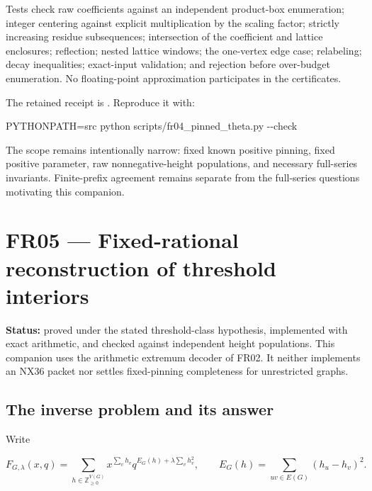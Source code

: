 \documentclass[
  11pt,
  a4paper,
]{report}
\newenvironment{Shaded}{}{}
\newcommand{\AttributeTok}[1]{\textcolor[rgb]{0.49,0.56,0.16}{#1}}
\newcommand{\ExtensionTok}[1]{#1}
\newcommand{\NormalTok}[1]{#1}
\newcommand{\OperatorTok}[1]{\textcolor[rgb]{0.40,0.40,0.40}{#1}}
\newcommand{\VariableTok}[1]{\textcolor[rgb]{0.10,0.09,0.49}{#1}}
\let\singularitytexttt\texttt
\renewcommand{\texttt}[1]{\singularitytexttt{\seqsplit{#1}}}
\begin{document}
Tests check raw coefficients against an independent product-box
enumeration; integer centering against explicit multiplication by the
scaling factor; strictly increasing residue subsequences; intersection
of the coefficient and lattice enclosures; reflection; nested lattice
windows; the one-vertex edge case; relabeling; decay inequalities;
exact-input validation; and rejection before over-budget enumeration. No
floating-point approximation participates in the certificates.

The retained receipt is \texttt{results/fr04\_pinned\_theta.json}.
Reproduce it with:

\begin{Shaded}
\begin{Highlighting}[]
\VariableTok{PYTHONPATH}\OperatorTok{=}\NormalTok{src }\ExtensionTok{python}\NormalTok{ scripts/fr04\_pinned\_theta.py }\AttributeTok{{-}{-}check}
\end{Highlighting}
\end{Shaded}

The scope remains intentionally narrow: fixed known positive pinning,
fixed positive parameter, raw nonnegative-height populations, and
necessary full-series invariants. Finite-prefix agreement remains
separate from the full-series questions motivating this companion.

\hypertarget{fr05-fixed-rational-reconstruction-of-threshold-interiors}{%
\chapter{FR05 --- Fixed-rational reconstruction of threshold
interiors}\label{fr05-fixed-rational-reconstruction-of-threshold-interiors}}

\textbf{Status:} proved under the stated threshold-class hypothesis,
implemented with exact arithmetic, and checked against independent
height populations. This companion uses the arithmetic extremum decoder
of FR02. It neither implements an NX36 packet nor settles fixed-pinning
completeness for unrestricted graphs.

\hypertarget{the-inverse-problem-and-its-answer}{%
\section{The inverse problem and its
answer}\label{the-inverse-problem-and-its-answer}}

Write

\[
 F_{G,\lambda}(x,q)=\sum_{h\in\mathbb Z_{\ge0}^{V(G)}}
 x^{\sum_vh_v}q^{E_G(h)+\lambda\sum_vh_v^2},
 \qquad E_G(h)=\sum_{uv\in E(G)}(h_u-h_v)^2.
\]
\end{document}
